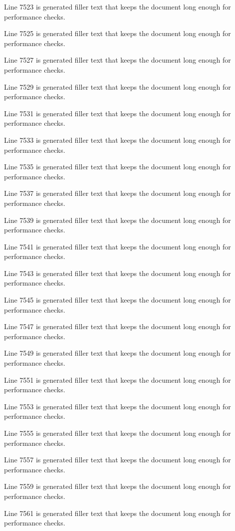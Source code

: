 Line 7523 is generated filler text that keeps the document long enough for performance checks.

Line 7525 is generated filler text that keeps the document long enough for performance checks.

Line 7527 is generated filler text that keeps the document long enough for performance checks.

Line 7529 is generated filler text that keeps the document long enough for performance checks.

Line 7531 is generated filler text that keeps the document long enough for performance checks.

Line 7533 is generated filler text that keeps the document long enough for performance checks.

Line 7535 is generated filler text that keeps the document long enough for performance checks.

Line 7537 is generated filler text that keeps the document long enough for performance checks.

Line 7539 is generated filler text that keeps the document long enough for performance checks.

Line 7541 is generated filler text that keeps the document long enough for performance checks.

Line 7543 is generated filler text that keeps the document long enough for performance checks.

Line 7545 is generated filler text that keeps the document long enough for performance checks.

Line 7547 is generated filler text that keeps the document long enough for performance checks.

Line 7549 is generated filler text that keeps the document long enough for performance checks.

Line 7551 is generated filler text that keeps the document long enough for performance checks.

Line 7553 is generated filler text that keeps the document long enough for performance checks.

Line 7555 is generated filler text that keeps the document long enough for performance checks.

Line 7557 is generated filler text that keeps the document long enough for performance checks.

Line 7559 is generated filler text that keeps the document long enough for performance checks.

Line 7561 is generated filler text that keeps the document long enough for performance checks.

